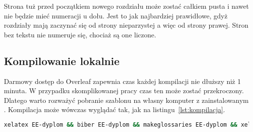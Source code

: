 Strona tuż przed początkiem nowego rozdziału może zostać całkiem pusta i nawet nie będzie mieć numeracji u dołu. Jest to jak najbardziej prawidłowe, gdyż rozdziały mają zaczynać się od strony nieparzystej a więc od strony prawej. Stron bez tekstu nie numeruje się, chociaż są one liczone.

\subsection{Kompilowanie lokalnie}
Darmowy dostęp do Overleaf zapewnia czas każdej kompilacji nie dłuższy niż 1 minuta. W przypadku skomplikowanej pracy czas ten może zostać przekroczony. Dlatego warto rozważyć pobranie szablonu na własny komputer z zainstalowanym . Kompilacja może wówczas wyglądać tak, jak na listingu~\ref{lst:kompilacja}.

\begin{lstlisting}[language=bash,
    caption={Kompilacja pracy dyplomowej lokalnie},
    label={lst:kompilacja}]
xelatex EE-dyplom && biber EE-dyplom && makeglossaries EE-dyplom && xelatex EE-dyplom && xelatex EE-dyplom
\end{lstlisting}
